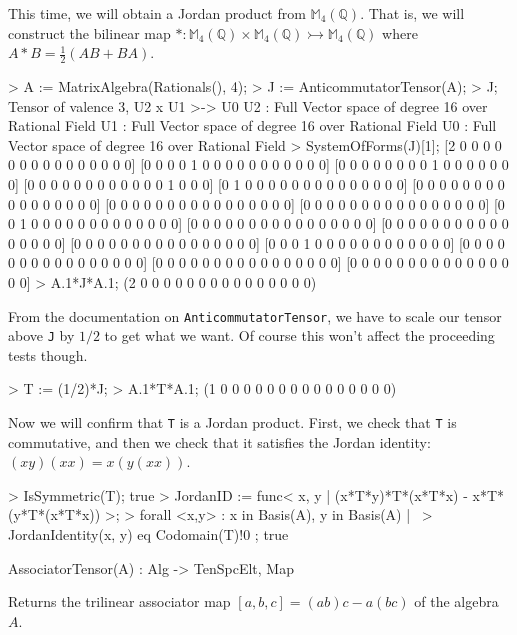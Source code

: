 \begin{example}[MatrixJordanAlgebra]
This time, we will obtain a Jordan product from $\mathbb{M}_4(\mathbb{Q})$. 
That is, we will construct the bilinear map $* : \mathbb{M}_4(\mathbb{Q})\times \mathbb{M}_4(\mathbb{Q})\rightarrowtail \mathbb{M}_4(\mathbb{Q})$ where $A*B = \frac{1}{2}(AB+BA)$. 
\begin{code}
> A := MatrixAlgebra(Rationals(), 4);
> J := AnticommutatorTensor(A);
> J;
Tensor of valence 3, U2 x U1 >-> U0
U2 : Full Vector space of degree 16 over Rational Field
U1 : Full Vector space of degree 16 over Rational Field
U0 : Full Vector space of degree 16 over Rational Field
> SystemOfForms(J)[1];
[2 0 0 0 0 0 0 0 0 0 0 0 0 0 0 0]
[0 0 0 0 1 0 0 0 0 0 0 0 0 0 0 0]
[0 0 0 0 0 0 0 0 1 0 0 0 0 0 0 0]
[0 0 0 0 0 0 0 0 0 0 0 0 1 0 0 0]
[0 1 0 0 0 0 0 0 0 0 0 0 0 0 0 0]
[0 0 0 0 0 0 0 0 0 0 0 0 0 0 0 0]
[0 0 0 0 0 0 0 0 0 0 0 0 0 0 0 0]
[0 0 0 0 0 0 0 0 0 0 0 0 0 0 0 0]
[0 0 1 0 0 0 0 0 0 0 0 0 0 0 0 0]
[0 0 0 0 0 0 0 0 0 0 0 0 0 0 0 0]
[0 0 0 0 0 0 0 0 0 0 0 0 0 0 0 0]
[0 0 0 0 0 0 0 0 0 0 0 0 0 0 0 0]
[0 0 0 1 0 0 0 0 0 0 0 0 0 0 0 0]
[0 0 0 0 0 0 0 0 0 0 0 0 0 0 0 0]
[0 0 0 0 0 0 0 0 0 0 0 0 0 0 0 0]
[0 0 0 0 0 0 0 0 0 0 0 0 0 0 0 0]
> A.1*J*A.1;
(2 0 0 0 0 0 0 0 0 0 0 0 0 0 0 0)
\end{code}

From the documentation on {\tt AnticommutatorTensor}, we have to scale our tensor above {\tt J} by $1/2$ to get what we want.
Of course this won't affect the proceeding tests though.
\begin{code}
> T := (1/2)*J;
> A.1*T*A.1;
(1 0 0 0 0 0 0 0 0 0 0 0 0 0 0 0)
\end{code}

Now we will confirm that {\tt T} is a Jordan product. 
First, we check that {\tt T} is commutative, and then we check that it satisfies the Jordan identity: $(xy)(xx)=x(y(xx))$.
\begin{code}
> IsSymmetric(T);
true
> JordanID := func< x, y | (x*T*y)*T*(x*T*x) - x*T*(y*T*(x*T*x)) >;
> forall{ <x,y> : x in Basis(A), y in Basis(A) | \
>     JordanIdentity(x, y) eq Codomain(T)!0 };
true
\end{code}
\end{example}

\begin{intrinsics}
AssociatorTensor(A) : Alg -> TenSpcElt, Map
\end{intrinsics}

Returns the trilinear associator map $[a,b,c]=(ab)c-a(bc)$ of the algebra $A$.

